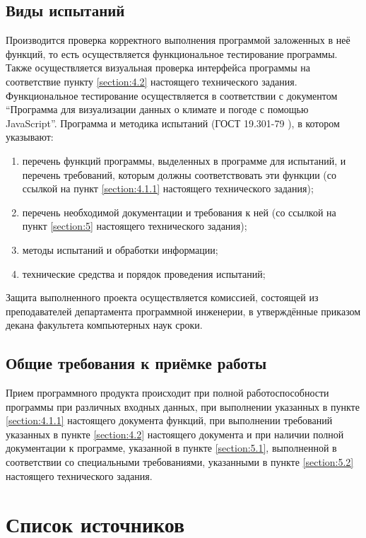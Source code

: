 \documentclass[a4paper, 12pt]{article}
\begin{document}
	\subsection{Виды испытаний}
	Производится проверка корректного выполнения программой заложенных в неё функций, то есть осуществляется функциональное
	тестирование программы. Также осуществляется визуальная проверка интерфейса программы на соответствие пункту
	\ref{section:4.2} настоящего технического задания. Функциональное тестирование осуществляется в соответствии с документом
	\enquote{Программа для визуализации данных о климате и погоде с помощью JavaScript}. Программа и методика испытаний (ГОСТ
	19.301-79 \cite{GOST_19.301-79}), в котором указывают:
	\begin{enumerate}
		\item перечень функций программы, выделенных в программе для испытаний, и перечень требований, которым должны
			соответствовать эти функции (со ссылкой на пункт \ref{section:4.1.1} настоящего технического задания);

		\item перечень необходимой документации и требования к ней (со ссылкой на пункт \ref{section:5} настоящего
			технического задания);

		\item методы испытаний и обработки информации;

		\item технические средства и порядок проведения испытаний;
	\end{enumerate}
	Защита выполненного проекта осуществляется комиссией, состоящей из преподавателей департамента программной инженерии, в
	утверждённые приказом декана факультета компьютерных наук сроки.

	\subsection{Общие требования к приёмке работы}
	Прием программного продукта происходит при полной работоспособности программы при различных входных данных, при
	выполнении указанных в пункте \ref{section:4.1.1} настоящего документа функций, при выполнении требований указанных
	в пункте \ref{section:4.2} настоящего документа и при наличии полной документации к программе, указанной в пункте
	\ref{section:5.1}, выполненной в соответствии со специальными требованиями, указанными в пункте
	\ref{section:5.2} настоящего технического задания.

	\section{Список источников}
	\begingroup
	\renewcommand{\section}[2]{}
	
	
	\endgroup

	\listRegistration
\end{document}
